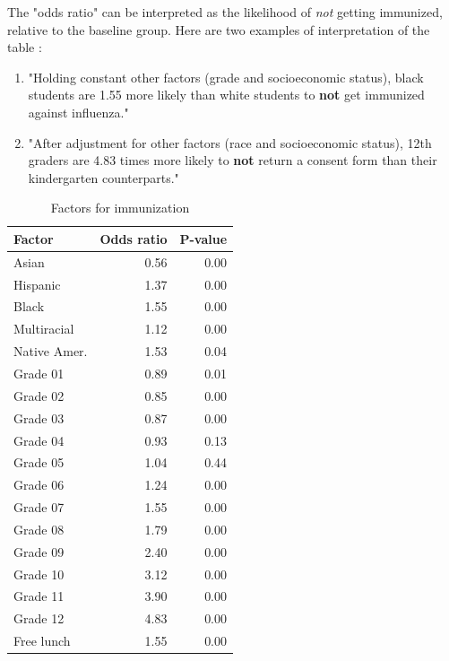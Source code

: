 \documentclass{article}
\begin{document}
\begin{multicols}{2}
\begin{multicols}{2}
The "odds ratio" can be interpreted as the likelihood of \emph{not} getting immunized, relative to the baseline group.  Here are two examples of interpretation of the  table :\begin{enumerate}
\item "Holding constant other factors (grade and socioeconomic status), black students are 1.55 more likely than white students to \textbf{not} get immunized against influenza."
\item "After adjustment for other factors (race and socioeconomic status), 12th graders are 4.83 times more likely to \textbf{not} return a consent form than their kindergarten counterparts."
\end{enumerate}

\vfill
\columnbreak


\begin{table}[H]
\begin{table}[ht]
\centering
{\small
\begin{tabular}{lrr}
  \hline
Factor & Odds ratio & P-value \\ 
  \hline
Asian & 0.56 & 0.00 \\ 
  Hispanic & 1.37 & 0.00 \\ 
  Black & 1.55 & 0.00 \\ 
  Multiracial & 1.12 & 0.00 \\ 
  Native Amer. & 1.53 & 0.04 \\ 
  Grade 01 & 0.89 & 0.01 \\ 
  Grade 02 & 0.85 & 0.00 \\ 
  Grade 03 & 0.87 & 0.00 \\ 
  Grade 04 & 0.93 & 0.13 \\ 
  Grade 05 & 1.04 & 0.44 \\ 
  Grade 06 & 1.24 & 0.00 \\ 
  Grade 07 & 1.55 & 0.00 \\ 
  Grade 08 & 1.79 & 0.00 \\ 
  Grade 09 & 2.40 & 0.00 \\ 
  Grade 10 & 3.12 & 0.00 \\ 
  Grade 11 & 3.90 & 0.00 \\ 
  Grade 12 & 4.83 & 0.00 \\ 
  Free lunch & 1.55 & 0.00 \\ 
   \hline
\end{tabular}
}
\caption{Factors for immunization} 
\end{table}\end{table}



\end{multicols}
\end{multicols}
\end{document}
